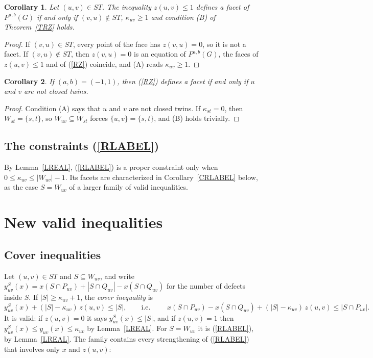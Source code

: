 \documentclass[a4paper,11pt]{article}
\newcommand{\ie}{{i.e.~}}
\newtheorem{cor}{Corollary}
\theoremstyle{definition}
\begin{document}
\begin{cor} \label{CZ1}
Let $(u,v) \in ST$. The inequality $z(u,v) \leq 1$ defines a facet of $P^{a,b}(G)$ if and only if $(v,u) \notin ST$,
$\kappa_{uv} \geq 1$ and condition (B) of Theorem~\ref{TRZ} holds.
\end{cor}
\begin{proof}
If $(v,u) \in ST$, every point of the face has $z(v,u) = 0$, so it is not a facet. If $(v,u) \notin ST$, then $z(v,u) = 0$ is an equation of
$P^{a,b}(G)$, the faces of $z(u,v) \leq 1$ and of (\ref{RZ}) coincide, and (A) reads $\kappa_{uv} \geq 1$.
\end{proof}

\begin{cor} \label{CRZ}
If $(a,b) = (-1,1)$, then (\ref{RZ}) defines a facet if and only if $u$ and $v$ are not closed twins.
\end{cor}
\begin{proof}
Condition (A) says that $u$ and $v$ are not closed twins. If $\kappa_{st} = 0$, then $W_{st} = \{s,t\}$, so $W_{uv} \subseteq W_{st}$ forces
$\{u,v\} = \{s,t\}$, and (B) holds trivially.
\end{proof}

\subsection{The constraints (\ref{RLABEL})}

By Lemma~\ref{LREAL}, (\ref{RLABEL}) is a proper constraint only when $0 \leq \kappa_{uv} \leq |W_{uv}| - 1$. Its facets are
characterized in Corollary~\ref{CRLABEL} below, as the case $S = W_{uv}$ of a larger family of valid inequalities.

\section{New valid inequalities}

\subsection{Cover inequalities}

Let $(u,v) \in ST$ and $S \subseteq W_{uv}$, and write $y^S_{uv}(x) = x(S \cap P_{uv}) + |S \cap Q_{uv}| - x(S \cap Q_{uv})$ for the
number of defects inside $S$. If $|S| \geq \kappa_{uv} + 1$, the \emph{cover inequality} is
\begin{equation} \label{RCOV}
y^S_{uv}(x) + (|S| - \kappa_{uv})\, z(u,v) \leq |S|, \qquad \textrm{\ie} \qquad
x(S \cap P_{uv}) - x(S \cap Q_{uv}) + (|S| - \kappa_{uv})\, z(u,v) \leq |S \cap P_{uv}|.
\end{equation}
It is valid: if $z(u,v) = 0$ it says $y^S_{uv}(x) \leq |S|$, and if $z(u,v) = 1$ then $y^S_{uv}(x) \leq y_{uv}(x) \leq \kappa_{uv}$ by
Lemma~\ref{LREAL}. For $S = W_{uv}$ it is (\ref{RLABEL}), by Lemma~\ref{LREAL}. The family contains every strengthening of (\ref{RLABEL}) that
involves only $x$ and $z(u,v)$:
\end{document}
